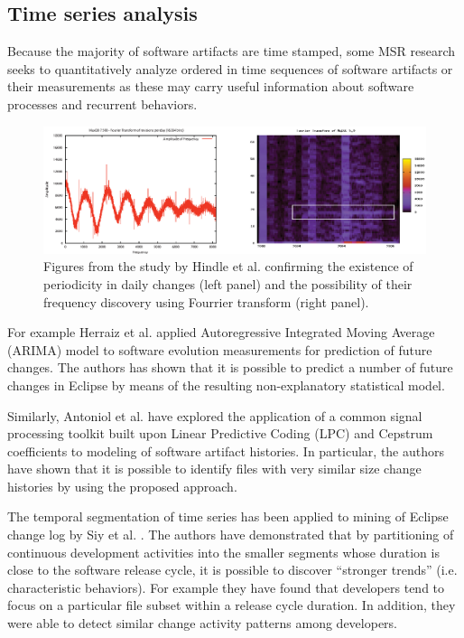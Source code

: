 \subsection{Time series analysis}\label{chapter2_section-tsanalysis}
Because the majority of software artifacts are time stamped, some MSR research seeks to quantitatively analyze ordered 
in time sequences of software artifacts or their measurements as these may carry useful information about software 
processes and recurrent behaviors. 

\begin{figure}[t!]
   \centering
   \includegraphics[width=145mm]{figures/FourrierMySQL.eps}
   \caption{Figures from the study by Hindle et al. \cite{citeulike:10377345} confirming the existence of periodicity
   in daily changes (left panel) and the possibility of their frequency discovery using Fourrier transform (right panel).   
   }
   \label{fig:mysql-fourrier}
\end{figure}

For example Herraiz et al. \cite{citeulike:6544685} applied Autoregressive Integrated Moving Average (ARIMA) model 
to software evolution measurements for prediction of future changes. The authors has shown that it is possible to 
predict a number of future changes in Eclipse by means of the resulting non-explanatory statistical model. 

Similarly, Antoniol et al. \cite{citeulike:3378725} have explored the application of a common signal processing toolkit 
built upon Linear Predictive Coding (LPC) and Cepstrum coefficients to modeling of software artifact histories. 
In particular, the authors have shown that it is possible to identify files with very similar size change histories 
by using the proposed approach.

The temporal segmentation of time series has been applied to mining of Eclipse change log by Siy et al. \cite{citeulike:10896305}.
The authors have demonstrated that by partitioning of continuous development activities into the smaller segments whose duration 
is close to the software release cycle, it is possible to discover ``stronger trends'' (i.e. characteristic behaviors). 
For example they have found that developers tend to focus on a particular file subset within a release cycle duration. 
In addition, they were able to detect similar change activity patterns among developers.

